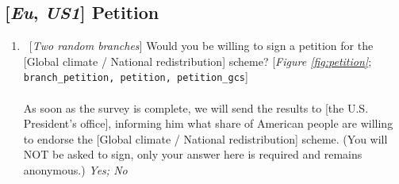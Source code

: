 \subsection*{[\textit{Eu}, \textit{US1}] Petition}
\begin{enumerate}[resume] \item ~[\textit{Two random branches}]  \label{q:petition} Would you be willing to sign a petition for the [Global climate / National redistribution] scheme?  [\textit{Figure \ref{fig:petition}}; \verb|branch_petition, petition, petition_gcs|]\\
\\
As soon as the survey is complete, we will send the results to [the U.S. President's office], informing him what share of American people are willing to endorse the [Global climate / National redistribution] scheme. (You will NOT be asked to sign, only your answer here is required and remains anonymous.) 
\textit{Yes; No}
\end{enumerate}

